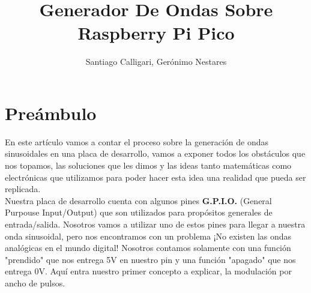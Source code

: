 \documentclass[]{article}
\title{Generador De Ondas Sobre Raspberry Pi Pico}
\author{Santiago Calligari, Gerónimo Nestares}
\begin{document}
\maketitle

\section*{Preámbulo}
En este artículo vamos a contar el proceso sobre la generación de ondas sinusoidales en una placa de desarrollo, vamos a exponer todos los obstáculos que nos topamos, las soluciones que les dimos y las ideas tanto matemáticas como electrónicas que utilizamos para poder hacer esta idea una realidad que pueda ser replicada.\\
Nuestra placa de desarrollo cuenta con algunos pines \textbf{G.P.I.O.} (General Purpouse Input/Output) que son utilizados para propósitos generales de entrada/salida. Nosotros vamos a utilizar uno de estos pines para llegar a nuestra onda sinusoidal, pero nos encontramos con un problema ¡No existen las ondas analógicas en el mundo digital! Nosotros contamos solamente con una función "prendido" que nos entrega 5V en nuestro pin y una función "apagado" que nos entrega 0V. Aquí entra nuestro primer concepto a explicar, la modulación por ancho de pulsos.
\end{document}
